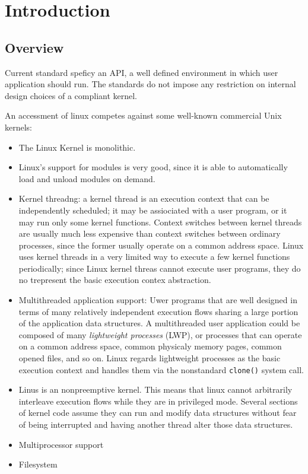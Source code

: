 \documentclass[a4paper,12pt]{book}
\begin{document}
\chapter{Introduction}
\section{Overview}
Current standard speficy an API, a well defined environment in which user
application should run. The standards do not impose any restriction on internal
design choices of a compliant kernel.

An accessment of linux competes against some well-known commercial Unix kernels:
\begin{itemize}
\item The Linux Kernel is monolithic. 
\item Linux's support for modules is very good, since it is able to
automatically load and unload modules on demand. 
\item Kernel threadng: a kernel thread is an execution context that can be
independently scheduled; it may be assiociated with a user program, or it may
run only some kernel functions. Context switches between kernel threads are
usually much less expensive than context switches between ordinary processes,
since the former usually operate on a common address space. Linux uses kernel
threads in a very limited way to execute a few kernel functions periodically;
since Linux kernel threas cannot execute user programs, they do no trepresent
the basic execution contex abstraction. 
\item Multithreaded application support: Uwer programs that are well designed in
terms of many relatively independent execution flows sharing a large portion of
the application data structures. A multithreaded user application could be
composed of many \emph{lightweight processes} (LWP), or processes that can
operate on a common address space, common physicaly memory pages, common opened
files, and so on. Linux regards lightweight processes as the basic execution
context and handles them via the nonstandard \verb|clone()| system call.
\item Linus is an nonpreemptive kernel. This means that linux cannot arbitrarily
interleave execution flows while they are in privileged mode. Several sections
of kernel code assume they can run and modify data structures without fear of
being interrupted and having another thread alter those data structures. 
\item Multiprocessor support
\item Filesystem
\end{itemize}
\end{document}
